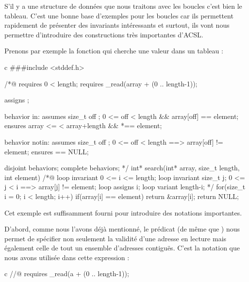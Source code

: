

S'il y a une structure de données que nous traitons avec les boucles c'est bien
le tableau. C'est une bonne base d'exemples pour les boucles car ils permettent
rapidement de présenter des invariants intéressants et surtout, ils vont nous 
permettre d'introduire des constructions très importantes d'ACSL.



Prenons par exemple la fonction qui cherche une valeur dans un tableau :



\begin{CodeBlock}{c}
###include <stddef.h>

/*@
  requires 0 < length;
  requires \valid_read(array + (0 .. length-1));
  
  assigns  \nothing;

  behavior in:
    assumes \exists size_t off ; 0 <= off < length && array[off] == element;
    ensures array <= \result < array+length && *\result == element;

  behavior notin:
    assumes \forall size_t off ; 0 <= off < length ==> array[off] != element;
    ensures \result == NULL;

  disjoint behaviors;
  complete behaviors;
*/
int* search(int* array, size_t length, int element){
  /*@
    loop invariant 0 <= i <= length;
    loop invariant \forall size_t j; 0 <= j < i ==> array[j] != element;
    loop assigns i;
    loop variant length-i;
  */ 
  for(size_t i = 0; i < length; i++)
    if(array[i] == element) return &array[i];
  return NULL;
}
\end{CodeBlock}



Cet exemple est suffisamment fourni pour introduire des notations importantes.



D'abord, comme nous l'avons déjà mentionné, le prédicat  (de 
même que ) nous permet de spécifier non seulement la validité d'une 
adresse en lecture mais également celle de tout un ensemble d'adresses 
contiguës. C'est la notation que nous avons utilisée dans cette expression :



\begin{CodeBlock}{c}
//@ requires \valid_read(a + (0 .. length-1));
\end{CodeBlock}



